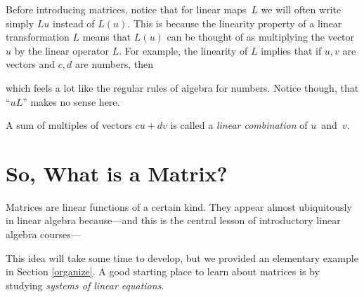 Before introducing matrices, notice that for linear maps~$L$ we will often write simply $L u$ instead of $L(u)$. This is because the linearity
property of a linear transformation $L$ means that $L(u)$ can be thought of as multiplying the vector $u$ by the linear operator $L$.
For example, the linearity of $L$ implies that if $u,v$ are vectors and $c,d$ are numbers, then
\begin{center}
\end{center}
which feels a lot like the regular rules of algebra for numbers. Notice though, that ``$u L$'' makes no sense here.

\begin{remark}
A sum of multiples of vectors $c u + dv$ is called a {\it linear combination} of $u$~and~$v$.
\end{remark}

\section{So, What is a Matrix?}
Matrices are linear functions of a certain kind. 
They appear almost ubiquitously in linear algebra because---and this is the central lesson of introductory linear algebra courses---
\begin{center}
\end{center}
This idea will take some time to develop, but we provided an elementary example in 
Section \ref{organize}. A good starting place to  learn about matrices is by studying {\it systems of  linear equations}. 


